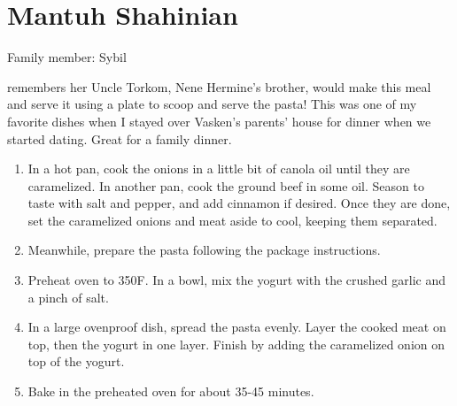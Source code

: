\chapter{Mantuh Shahinian}
\label{ch:mantuhshahinian}


Family member: Sybil

 remembers her Uncle Torkom, Nene Hermine's brother, would make this meal and serve it using a plate to scoop and serve the pasta! This was one of my favorite dishes when I stayed over Vasken's parents' house for dinner when we started dating. Great for a family dinner.

\begin{enumerate}
    \item In a hot pan, cook the onions in a little bit of canola oil until they are caramelized. In another pan, cook the ground beef in some oil. Season to taste with salt and pepper, and add cinnamon if desired. Once they are done, set the caramelized onions and meat aside to cool, keeping them separated.
    \item Meanwhile, prepare the pasta following the package instructions.
    \item Preheat oven to 350\degree F. In a bowl, mix the yogurt with the crushed garlic and a pinch of salt.
    \item In a large ovenproof dish, spread the pasta evenly. Layer the cooked meat on top, then the yogurt in one layer. Finish by adding the caramelized onion on top of the yogurt.
    \item Bake in the preheated oven for about 35-45 minutes.
\end{enumerate}
